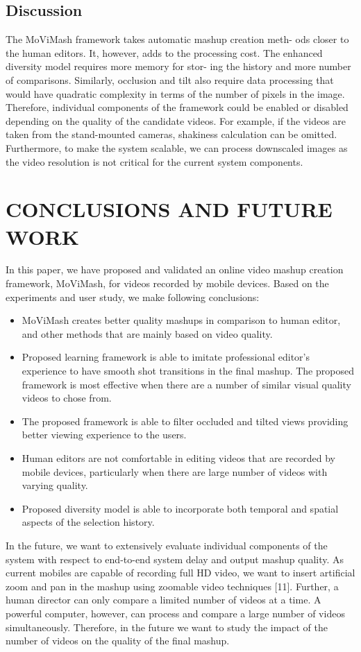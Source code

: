 \documentclass{sig-alternate-05-2015}
\begin{document}
\subsection{Discussion}
The MoViMash framework takes automatic mashup creation meth-
ods closer to the human editors. It, however, adds to the processing cost. The enhanced diversity model requires more memory for stor-
ing the history and more number of comparisons. Similarly, occlusion and tilt also require data processing that would have quadratic
complexity in terms of the number of pixels in the image. Therefore, individual components of the framework could be enabled or
disabled depending on the quality of the candidate videos. For example, if the videos are taken from the stand-mounted cameras,
shakiness calculation can be omitted. Furthermore, to make the
system scalable, we can process downscaled images as the video
resolution is not critical for the current system components.
\section{CONCLUSIONS AND FUTURE WORK}
In this paper, we have proposed and validated an online video
mashup creation framework, MoViMash, for videos recorded by
mobile devices. Based on the experiments and user study, we make
following conclusions:
\begin{itemize}
\item MoViMash creates better quality mashups in comparison to
human editor, and other methods that are mainly based on
video quality.
\item Proposed learning framework is able to imitate professional
editor’s experience to have smooth shot transitions in the final mashup. The proposed framework is most effective when there are a number of similar visual quality videos to chose
from.
\item The proposed framework is able to filter occluded and tilted
views providing better viewing experience to the users.
\item Human editors are not comfortable in editing videos that are
recorded by mobile devices, particularly when there are large
number of videos with varying quality.
\item Proposed diversity model is able to incorporate both temporal and spatial aspects of the selection history.
\end{itemize}
In the future, we want to extensively evaluate individual components of the system with respect to end-to-end system delay and
output mashup quality. As current mobiles are capable of recording full HD video, we want to insert artificial zoom and pan in the
mashup using zoomable video techniques [11]. Further, a human
director can only compare a limited number of videos at a time.
A powerful computer, however, can process and compare a large
number of videos simultaneously. Therefore, in the future we want
to study the impact of the number of videos on the quality of the
final mashup.
\end{document}
